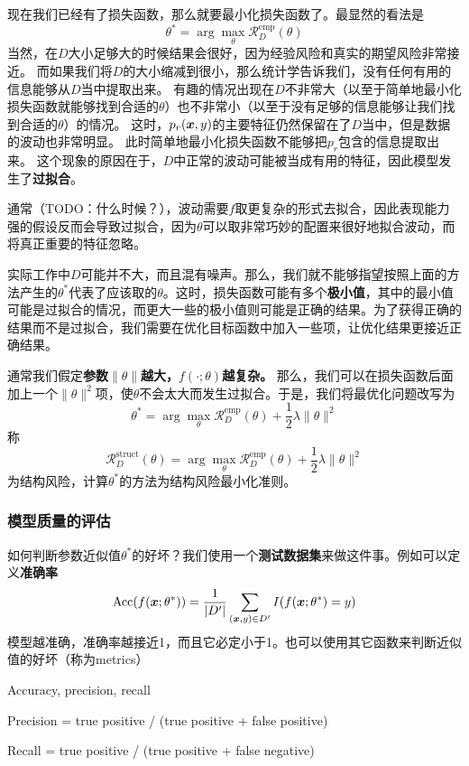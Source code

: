 \documentclass[UTF8, a4paper]{ctexart}
\newcommand*{\argmax}{\arg \max}
\begin{document}
现在我们已经有了损失函数，那么就要最小化损失函数了。最显然的看法是 
\[
\theta^* = \argmax_\theta \mathcal{R}_D^\text{emp}(\theta)
\]
当然，在$D$大小足够大的时候结果会很好，因为经验风险和真实的期望风险非常接近。
而如果我们将$D$的大小缩减到很小，那么统计学告诉我们，没有任何有用的信息能够从$D$当中提取出来。
有趣的情况出现在$D$不非常大（以至于简单地最小化损失函数就能够找到合适的$\theta$）也不非常小（以至于没有足够的信息能够让我们找到合适的$\theta$）的情况。
这时，$p_r(\vb*{x}, y)$的主要特征仍然保留在了$D$当中，但是数据的波动也非常明显。
此时简单地最小化损失函数不能够把$p_r$包含的信息提取出来。
这个现象的原因在于，$D$中正常的波动可能被当成有用的特征，因此模型发生了\textbf{过拟合}。

通常（TODO：什么时候？），波动需要$f$取更复杂的形式去拟合，因此表现能力强的假设反而会导致过拟合，因为$\theta$可以取非常巧妙的配置来很好地拟合波动，而将真正重要的特征忽略。

实际工作中$D$可能并不大，而且混有噪声。那么，我们就不能够指望按照上面的方法产生的$\theta^*$代表了应该取的$\theta$。这时，损失函数可能有多个\textbf{极小值}，其中的最小值可能是过拟合的情况，而更大一些的极小值则可能是正确的结果。为了获得正确的结果而不是过拟合，我们需要在优化目标函数中加入一些项，让优化结果更接近正确结果。

通常我们假定\textbf{参数$\|\theta\|$越大，$f(\cdot;\theta)$越复杂。}
那么，我们可以在损失函数后面加上一个$\|\theta\|^2$项，使$\theta$不会太大而发生过拟合。于是，我们将最优化问题改写为
\[
\theta^* = \argmax_\theta \mathcal{R}_D^\text{emp}(\theta) + \frac{1}{2} \lambda \|\theta\|^2
\] 称 \[
\mathcal{R}_D^\text{struct}(\theta) = \argmax_\theta \mathcal{R}_D^\text{emp}(\theta) + \frac{1}{2} \lambda \|\theta\|^2
\] 为结构风险，计算$\theta^*$的方法为结构风险最小化准则。

\subsubsection{模型质量的评估}

如何判断参数近似值$\theta^*$的好坏？我们使用一个\textbf{测试数据集}来做这件事。例如可以定义\textbf{准确率}
\[
\mathrm{Acc}(f(\vb*{x};\theta^*)) = \frac{1}{|D'|} \sum_{(\vb*{x}, y) \in D'} I(f(\vb*{x};\theta^*)=y)
\]
模型越准确，准确率越接近1，而且它必定小于1。也可以使用其它函数来判断近似值的好坏（称为metrics）

Accuracy, precision, recall

Precision = true positive / (true positive + false positive)

Recall = true positive / (true positive + false negative)
\end{document}
